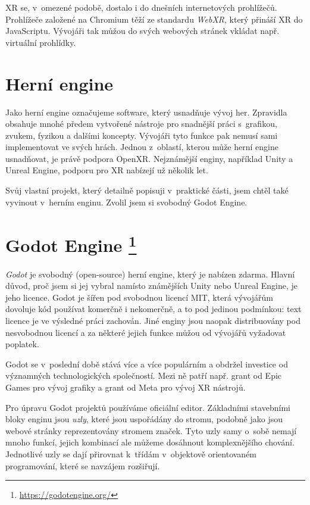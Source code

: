 XR se, v~omezené podobě, dostalo i do dnešních internetových prohlížečů. Prohlížeče založené na Chromium těží ze standardu \textit{WebXR}, který přináší XR do JavaScriptu. Vývojáři tak můžou do svých webových stránek vkládat např. virtuální prohlídky. \cite{webxr_mdn}

\section{Herní engine}

Jako herní engine označujeme software, který usnadňuje vývoj her. Zpravidla obsahuje mnohé předem vytvořené nástroje pro snadnější práci s~grafikou, zvukem, fyzikou a dalšími koncepty. Vývojáři tyto funkce pak nemusí sami implementovat ve svých hrách. Jednou z~oblastí, kterou může herní engine usnadňovat, je právě podpora OpenXR. Nejznámější enginy, například Unity a Unreal Engine, podporu pro XR nabízejí už několik let. \cite{enwiki:1186405367}

Svůj vlastní projekt, který detailně popisuji v~praktické části, jsem chtěl také vyvinout v~herním enginu. Zvolil jsem si svobodný Godot Engine.

\section[Godot Engine]{Godot Engine \protect\footnote{\url{https://godotengine.org/}}}

\textit{Godot} je svobodný (open-source) herní engine, který je nabízen zdarma. Hlavní důvod, proč jsem si jej vybral namísto známějších Unity nebo Unreal Engine, je jeho licence. Godot je šířen pod svobodnou licencí MIT, která vývojářům dovoluje kód používat komerčně i nekomerčně, a to pod jedinou podmínkou: text licence je ve výsledné práci zachován. Jiné enginy jsou naopak distribuovány pod nesvobodnou licencí a za některé jejich funkce můžou od vývojářů vyžadovat poplatek.

Godot se v~poslední době stává více a více populárním a obdržel investice od významných technologických společností. Mezi ně patří např. grant od Epic Games pro vývoj grafiky a grant od Meta pro vývoj XR nástrojů. \cite{godot_epicgames} \cite{godot_meta}

Pro úpravu Godot projektů používáme oficiální editor. Základními stavebními bloky enginu jsou \textit{uzly}, které jsou uspořádány do stromu, podobně jako jsou webové stránky reprezentovány stromem značek. Tyto uzly samy o~sobě nemají mnoho funkcí, jejich kombinací ale můžeme dosáhnout komplexnějšího chování. Jednotlivé uzly se dají přirovnat k~třídám v~objektově orientovaném programování, které se navzájem rozšiřují.

